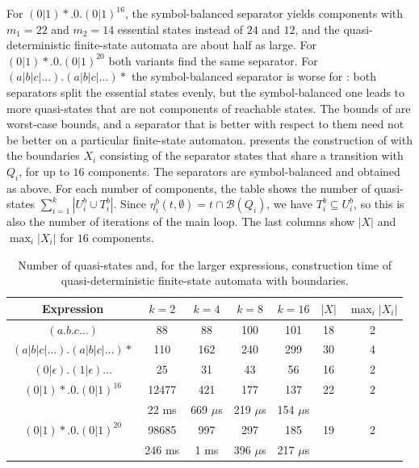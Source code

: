 For $(0|1)*.0.(0|1)^{16}$, the symbol-balanced separator yields components with $m_1 =
22$ and $m_2 = 14$ essential states instead of $24$ and $12$, and the
quasi-deterministic finite-state automata are about half as large. For $(0|1)*.0.(0|1)^{20}$
both variants find the same separator. For $(a|b|c|...).(a|b|c|...)*$ the
symbol-balanced separator is worse for : both
separators split the essential states evenly, but the symbol-balanced one leads to more
quasi-states that are not components of reachable states. The bounds of
 are worst-case bounds, and a separator that is better
with respect to them need not be better on a particular finite-state automaton.
\bigbreak
{} presents the construction of
 with the boundaries $X_i$ consisting of the
separator states that share a transition with $Q_i$, for up to $16$ components. The
separators are symbol-balanced and obtained as above. For each number of components, the
table shows the number of quasi-states $\sum_{i=1}^k |U_i^b \cup T_i^b|$. Since
$\eta_i^b(t, \emptyset) = t \cap \mathcal{B}(Q_i)$, we have $T_i^b \subseteq U_i^b$, so this is
also the number of iterations of the main loop. The last columns show $|X|$ and $\max_i |X_i|$ for $16$ components.

\begin{table}[ht]
  \centering
  \small
  \setlength{\tabcolsep}{4pt}
  \begin{tabular}{||c c c c c c c||}
    \hline
    Expression & $k = 2$ & $k = 4$ & $k = 8$ & $k = 16$ & $|X|$ & $\max_i |X_i|$ \\ [0.5ex]
    \hline
    $(a.b.c...)$ & 88 & 88 & 100 & 101 & 18 & 2 \\
    \hline
    $(a|b|c|...).(a|b|c|...)*$ & 110 & 162 & 240 & 299 & 30 & 4 \\
    \hline
    $(0|\epsilon).(1|\epsilon)...$ & 25 & 31 & 43 & 56 & 16 & 2 \\
    \hline
    $(0|1)*.0.(0|1)^{16}$ & 12477 & 421 & 177 & 137 & 22 & 2 \\
     & 22 ms & 669 $\mu$s & 219 $\mu$s & 154 $\mu$s & & \\
    \hline
    $(0|1)*.0.(0|1)^{20}$ & 98685 & 997 & 297 & 185 & 19 & 2 \\
     & 246 ms & 1 ms & 396 $\mu$s & 217 $\mu$s & & \\
    \hline
  \end{tabular}
  \caption{Number of quasi-states and, for the larger expressions, construction time of
    quasi-deterministic finite-state automata with boundaries.}
  \label{tbl:boundary_comparison}
\end{table}

